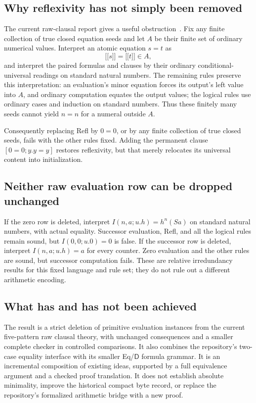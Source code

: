 \documentclass[11pt]{article}
\theoremstyle{definition}\newtheorem{definition}[theorem]{Definition}
\newcommand{\D}{\mathsf D}
\newcommand{\llbracket}{\mathopen{[\![}}
\newcommand{\rrbracket}{\mathclose{]\!]}}
\begin{document}
\subsection{Why reflexivity has not simply been removed}

The current raw-clausal report gives a useful obstruction~\cite{obstruction}. Fix any
finite collection of true closed equation seeds and let $A$ be their
finite set of ordinary numerical values. Interpret an atomic equation
$s=t$ as
\[
             \llbracket s\rrbracket=\llbracket t\rrbracket\in A,
\]
and interpret the paired formulas and clauses by their ordinary
conditional-universal readings on standard natural numbers.
The remaining rules preserve this interpretation: an evaluation's
minor equation forces its output's left value into $A$, and ordinary
computation equates the output values; the logical rules use ordinary
cases and induction on standard numbers. Thus these finitely many
seeds cannot yield $n=n$ for a numeral outside $A$.

Consequently replacing Refl by $0=0$, or by any finite collection
of true closed seeds, fails with the other rules fixed. Adding the
permanent clause $[0=0;y.y=y]$ restores reflexivity, but that merely
relocates its universal content into initialization.

\subsection{Neither raw evaluation row can be dropped unchanged}

If the zero row is deleted, interpret
$I(n,a;u.h)=h^n(Sa)$ on standard natural numbers, with actual equality.
Successor evaluation, Refl, and all the logical rules remain sound,
but $I(0,0;u.0)=0$ is false. If the successor row is deleted,
interpret $I(n,a;u.h)=a$ for every counter. Zero evaluation and the
other rules are sound, but successor computation fails. These are
relative irredundancy results for this fixed language and rule set;
they do not rule out a different arithmetic encoding.

\subsection{What has and has not been achieved}

The result is a strict deletion of primitive evaluation instances
from the current five-pattern raw clausal theory, with unchanged
consequences and a smaller complete checker in controlled comparisons.
It also combines the repository's two-case equality interface with
its smaller Eq/$\D$ formula grammar. It is an incremental composition
of existing ideas, supported by a full equivalence argument and a
checked proof translation. It does not establish absolute minimality,
improve the historical compact byte record, or replace the repository's
formalized arithmetic bridge with a new proof.
\end{document}
